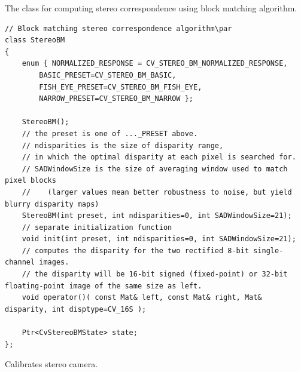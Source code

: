 The class for computing stereo correspondence using block matching algorithm.

\begin{lstlisting}
// Block matching stereo correspondence algorithm\par
class StereoBM
{
    enum { NORMALIZED_RESPONSE = CV_STEREO_BM_NORMALIZED_RESPONSE,
        BASIC_PRESET=CV_STEREO_BM_BASIC,
        FISH_EYE_PRESET=CV_STEREO_BM_FISH_EYE,
        NARROW_PRESET=CV_STEREO_BM_NARROW };

    StereoBM();
    // the preset is one of ..._PRESET above.
    // ndisparities is the size of disparity range,
    // in which the optimal disparity at each pixel is searched for.
    // SADWindowSize is the size of averaging window used to match pixel blocks
    //    (larger values mean better robustness to noise, but yield blurry disparity maps)
    StereoBM(int preset, int ndisparities=0, int SADWindowSize=21);
    // separate initialization function
    void init(int preset, int ndisparities=0, int SADWindowSize=21);
    // computes the disparity for the two rectified 8-bit single-channel images.
    // the disparity will be 16-bit signed (fixed-point) or 32-bit floating-point image of the same size as left.
    void operator()( const Mat& left, const Mat& right, Mat& disparity, int disptype=CV_16S );

    Ptr<CvStereoBMState> state;
};
\end{lstlisting}

\fi

Calibrates stereo camera.


